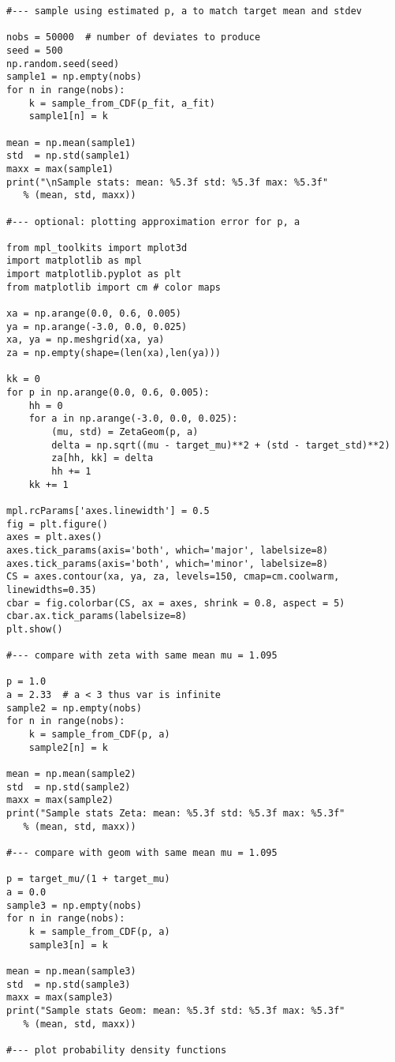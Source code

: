 \documentclass[oneside,10pt]{book}
\begin{document}
\begin{lstlisting}
#--- sample using estimated p, a to match target mean and stdev

nobs = 50000  # number of deviates to produce
seed = 500
np.random.seed(seed)
sample1 = np.empty(nobs)
for n in range(nobs):
    k = sample_from_CDF(p_fit, a_fit)
    sample1[n] = k

mean = np.mean(sample1)
std  = np.std(sample1)
maxx = max(sample1)
print("\nSample stats: mean: %5.3f std: %5.3f max: %5.3f"
   % (mean, std, maxx))

#--- optional: plotting approximation error for p, a

from mpl_toolkits import mplot3d
import matplotlib as mpl
import matplotlib.pyplot as plt
from matplotlib import cm # color maps

xa = np.arange(0.0, 0.6, 0.005)
ya = np.arange(-3.0, 0.0, 0.025)
xa, ya = np.meshgrid(xa, ya)
za = np.empty(shape=(len(xa),len(ya)))

kk = 0
for p in np.arange(0.0, 0.6, 0.005):
    hh = 0
    for a in np.arange(-3.0, 0.0, 0.025):
        (mu, std) = ZetaGeom(p, a)
        delta = np.sqrt((mu - target_mu)**2 + (std - target_std)**2)
        za[hh, kk] = delta
        hh += 1
    kk += 1

mpl.rcParams['axes.linewidth'] = 0.5
fig = plt.figure()
axes = plt.axes()
axes.tick_params(axis='both', which='major', labelsize=8)
axes.tick_params(axis='both', which='minor', labelsize=8)
CS = axes.contour(xa, ya, za, levels=150, cmap=cm.coolwarm, linewidths=0.35)
cbar = fig.colorbar(CS, ax = axes, shrink = 0.8, aspect = 5)
cbar.ax.tick_params(labelsize=8)
plt.show()

#--- compare with zeta with same mean mu = 1.095

p = 1.0
a = 2.33  # a < 3 thus var is infinite
sample2 = np.empty(nobs)
for n in range(nobs):
    k = sample_from_CDF(p, a)
    sample2[n] = k

mean = np.mean(sample2)
std  = np.std(sample2)
maxx = max(sample2)
print("Sample stats Zeta: mean: %5.3f std: %5.3f max: %5.3f"
   % (mean, std, maxx))

#--- compare with geom with same mean mu = 1.095

p = target_mu/(1 + target_mu)
a = 0.0
sample3 = np.empty(nobs)
for n in range(nobs):
    k = sample_from_CDF(p, a)
    sample3[n] = k

mean = np.mean(sample3)
std  = np.std(sample3)
maxx = max(sample3)
print("Sample stats Geom: mean: %5.3f std: %5.3f max: %5.3f"
   % (mean, std, maxx))

#--- plot probability density functions


\end{lstlisting}
\end{document}

